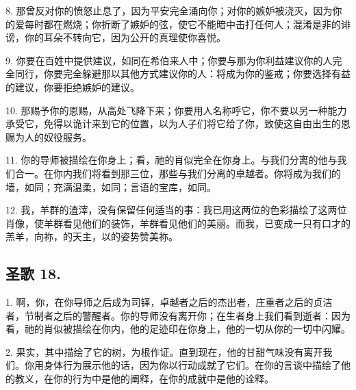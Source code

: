 8. 那曾反对你的愤怒止息了，因为平安完全涌向你；对你的嫉妒被浇灭，因为你的爱每时都在燃烧；你折断了嫉妒的弦，使它不能暗中击打任何人；混淆是非的诽谤，你的耳朵不转向它，因为公开的真理使你喜悦。\par

9. 你要在百姓中提供建议，如同在希伯来人中；你要与那为你利益建议你的人完全同行，你要完全躲避那以其他方式建议你的人：将成为你的鉴戒；你要选择有益的建议，你要拒绝嫉妒的建议。\par

10. 那赐予你的恩赐，从高处飞降下来；你要用人名称呼它，你不要以另一种能力承受它，免得以诡计来到它的位置，以为人子们将它给了你，致使这自由出生的恩赐为人的奴役服务。\par

11. 你的导师被描绘在你身上；看，祂的肖似完全在你身上。与我们分离的他与我们合一。在你内我们将看到那三位，那些与我们分离的卓越者。你将成为我们的墙，如同；充满温柔，如同；言语的宝库，如同。\par

12. 我，羊群的渣滓，没有保留任何适当的事：我已用这两位的色彩描绘了这两位肖像，使羊群看见他们的装饰，羊群看见他们的美丽。而我，已变成一只有口才的羔羊，向祢，的天主，以的姿势赞美祢。\par


\subsection{圣歌 18.}

1. 啊，你，在你导师之后成为司铎，卓越者之后的杰出者，庄重者之后的贞洁者，节制者之后的警醒者。你的导师没有离开你；在生者身上我们看到逝者：因为看，祂的肖似被描绘在你内，他的足迹印在你身上，他的一切从你的一切中闪耀。\par

2. 果实，其中描绘了它的树，为根作证。直到现在，他的甘甜气味没有离开我们。你用身体行为展示他的话，因为你以行动成就了它们。在你的言谈中描绘了他的教义，在你的行为中是他的阐释，在你的成就中是他的诠释。\par

